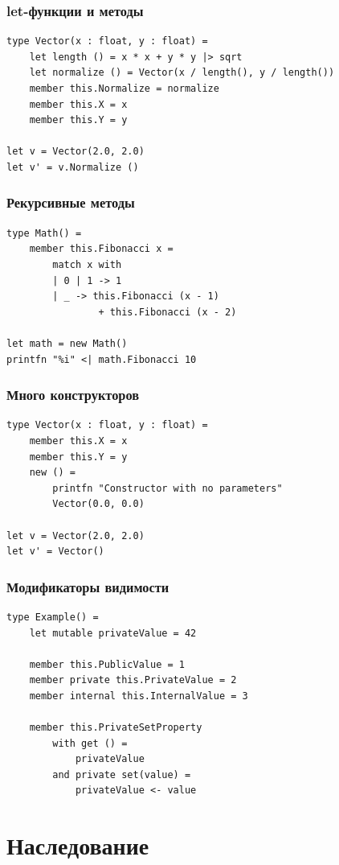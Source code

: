 \documentclass{../../slides-style}
\begin{document}
    \begin{frame}[fragile]
        \frametitle{let-функции и методы}
        \begin{verbatim}
type Vector(x : float, y : float) = 
    let length () = x * x + y * y |> sqrt
    let normalize () = Vector(x / length(), y / length())
    member this.Normalize = normalize
    member this.X = x
    member this.Y = y

let v = Vector(2.0, 2.0)
let v' = v.Normalize ()
        \end{verbatim}
    \end{frame}

    \begin{frame}[fragile]
        \frametitle{Рекурсивные методы}
        \begin{verbatim}
type Math() = 
    member this.Fibonacci x = 
        match x with
        | 0 | 1 -> 1
        | _ -> this.Fibonacci (x - 1) 
                + this.Fibonacci (x - 2)

let math = new Math()
printfn "%i" <| math.Fibonacci 10
        \end{verbatim}
    \end{frame}

    \begin{frame}[fragile]
        \frametitle{Много конструкторов}
        \begin{verbatim}
type Vector(x : float, y : float) = 
    member this.X = x
    member this.Y = y
    new () = 
        printfn "Constructor with no parameters"
        Vector(0.0, 0.0)

let v = Vector(2.0, 2.0)
let v' = Vector()
        \end{verbatim}
    \end{frame}

    \begin{frame}[fragile]
        \frametitle{Модификаторы видимости}
        \begin{verbatim}
type Example() = 
    let mutable privateValue = 42

    member this.PublicValue = 1
    member private this.PrivateValue = 2
    member internal this.InternalValue = 3

    member this.PrivateSetProperty 
        with get () = 
            privateValue 
        and private set(value) = 
            privateValue <- value
        \end{verbatim}
    \end{frame}

    \section{Наследование}
\end{document}
